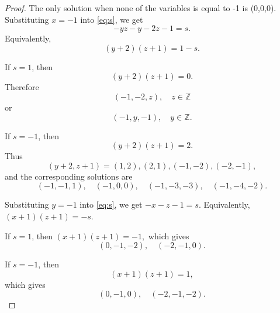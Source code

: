 \documentclass{article}
\begin{document}
\begin{proof}
The only solution when none of the variables is equal to -1 is (0,0,0).
Substituting $x=-1$ into \eqref{eq:s}, we get
\[
-yz-y-2z-1=s.
\]
Equivalently,
\[
(y+2)(z+1)=1-s.
\]

If $s=1$, then
\[
(y+2)(z+1)=0.
\]
Therefore
\[
{(-1,-2,z),\quad z\in\mathbb Z}
\]
or
\[
{(-1,y,-1),\quad y\in\mathbb Z}.
\]

If $s=-1$, then
\[
(y+2)(z+1)=2.
\]
Thus
\[
(y+2,z+1)=(1,2),(2,1),(-1,-2),(-2,-1),
\]
and the corresponding solutions are
\[
{(-1,-1,1),\quad (-1,0,0),\quad (-1,-3,-3),\quad (-1,-4,-2)}.
\]


Substituting $y=-1$ into \eqref{eq:s}, we get
\(
-x-z-1=s.
\)
Equivalently,
\(
(x+1)(z+1)=-s.
\)

If $s=1$, then
\(
(x+1)(z+1)=-1,
\)
which gives
\[
{(0,-1,-2),\quad (-2,-1,0)}.
\]

If $s=-1$, then
\[
(x+1)(z+1)=1,
\]
which gives
\[
{(0,-1,0),\quad (-2,-1,-2)}.
\]

\end{proof}
\end{document}
